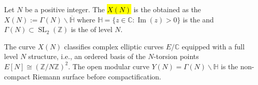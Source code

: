 \begin{definition} \label{definition:modular_curve_X_N_with_level_N_structure}
Let $N$ be a positive integer. The  \hl{$X(N)$} is the   obtained as the 
$X(N) := \Gamma(N)\backslash\overline{\mathbb{H}}$
where $\mathbb{H} = \{z \in \mathbb{C} : \operatorname{Im}(z) > 0\}$ is the  and $\Gamma(N) \subset \operatorname{SL}_2(\mathbb{Z})$ is the  of level $N$.

The curve $X(N)$ classifies complex elliptic curves $E/\mathbb{C}$ equipped with a full level $N$ structure, i.e., an ordered basis of the $N$-torsion points $E[N] \cong (\mathbb{Z}/N\mathbb{Z})^2$.
The open modular curve $Y(N) = \Gamma(N)\backslash\mathbb{H}$ is the non-compact Riemann surface before compactification.
\end{definition}

